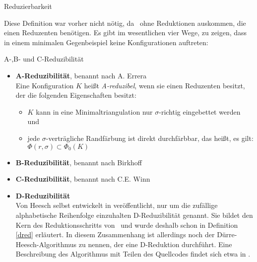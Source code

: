\begin{section}{Reduzierbarkeit}
 
 Diese Definition war vorher nicht nötig, da \rsst\-\ ohne Reduktionen auskommen, die einen Reduzenten benötigen. Es gibt im wesentlichen vier Wege, zu zeigen, dass in einem minimalen Gegenbeispiel keine Konfigurationen auftreten:
 
 \begin{definition}{A-,B- und C-Reduzibilität}
  \begin{itemize}
   \item \textbf{A-Reduzibilität}, benannt nach A. Errera\\
   Eine Konfiguration $K$ heißt \textit{A-reduzibel}, wenn sie einen Reduzenten besitzt, der die folgenden Eigenschaften besitzt:
   \begin{itemize}
    \item $K$ kann in eine Minimaltriangulation nur $\sigma$-richtig eingebettet werden und
    \item jede $\sigma$-verträgliche Randfärbung ist direkt durchfärbbar, das heißt, es gilt: $\Phi(r,\sigma) \subset \Phi_0(K)$
   \end{itemize}

   \item \textbf{B-Reduzibilität}, benannt nach Birkhoff\\
   \item \textbf{C-Reduzibilität}, benannt nach C.E. Winn\\
   \item \textbf{D-Reduzibilität}\\
   Von Heesch selbst entwickelt in \cite{heesch} veröffentlicht, nur um die zufällige alphabetische Reihenfolge einzuhalten D-Reduzibilität genannt. Sie bildet den Kern  des Reduktionsschritts von \rsst\-\ und wurde deshalb schon in Definition \ref{dred} erläutert. In diesem Zusammenhang ist allerdings noch der Dürre-Heesch-Algorithmus zu nennen, der eine D-Reduktion durchführt. Eine Beschreibung des Algorithmus mit Teilen des Quellcodes findet sich etwa in \cite[Kapitel 6.4]{fritsch}.
  \end{itemize}
 \end{definition}

\end{section}
